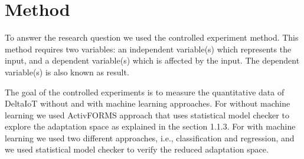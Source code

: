 \documentclass[a4paper,12pt]{article}
\begin{document}
\section{Method} \label{Method}

To answer the research question we used the controlled experiment method. This method requires two variables: an independent variable(s) which represents the input, and a dependent variable(s) which is affected by the input. The dependent variable(s) is also known as result.

The goal of the controlled experiments is to measure the quantitative data of DeltaIoT without and with machine learning approaches. For without machine learning we used ActivFORMS approach that uses statistical model checker to explore the adaptation space as explained in the section 1.1.3. For with machine learning we used two different approaches, i.e., classification and regression, and we used statistical model checker to verify the reduced adaptation space.
\end{document}
